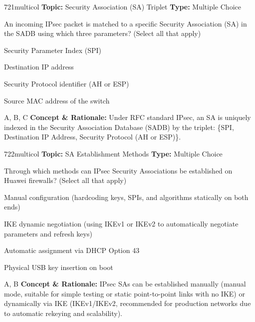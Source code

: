 \begin{qcard}{721}{multicol}
\textcolor{darkslate!75}{\small\textbf{Topic:} Security Association (SA) Triplet \hfill \textbf{Type:} Multiple Choice}\vspace{0.4em}\par
An incoming IPsec packet is matched to a specific Security Association (SA) in the SADB using which three parameters? (Select all that apply)
\begin{qoptions}
\item Security Parameter Index (SPI)
\item Destination IP address
\item Security Protocol identifier (AH or ESP)
\item Source MAC address of the switch
\end{qoptions}
\end{qcard}
\nopagebreak
\begin{explainbox}{A, B, C}
\textbf{Concept \& Rationale:} Under RFC standard IPsec, an SA is uniquely indexed in the Security Association Database (SADB) by the triplet: \{SPI, Destination IP Address, Security Protocol (AH or ESP)\}.
\end{explainbox}

\begin{qcard}{722}{multicol}
\textcolor{darkslate!75}{\small\textbf{Topic:} SA Establishment Methods \hfill \textbf{Type:} Multiple Choice}\vspace{0.4em}\par
Through which methods can IPsec Security Associations be established on Huawei firewalls? (Select all that apply)
\begin{qoptions}
\item Manual configuration (hardcoding keys, SPIs, and algorithms statically on both ends)
\item IKE dynamic negotiation (using IKEv1 or IKEv2 to automatically negotiate parameters and refresh keys)
\item Automatic assignment via DHCP Option 43
\item Physical USB key insertion on boot
\end{qoptions}
\end{qcard}
\nopagebreak
\begin{explainbox}{A, B}
\textbf{Concept \& Rationale:} IPsec SAs can be established manually (manual mode, suitable for simple testing or static point-to-point links with no IKE) or dynamically via IKE (IKEv1/IKEv2, recommended for production networks due to automatic rekeying and scalability).
\end{explainbox}

